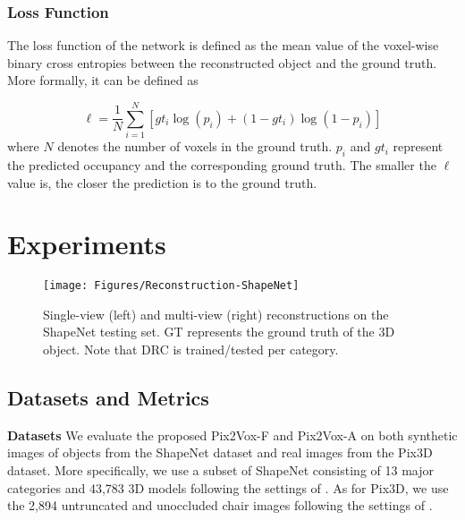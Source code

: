 \documentclass[10pt,twocolumn,letterpaper]{article}
\begin{document}
\vspace{-3 mm}
\subsubsection{Loss Function}
\vspace{-1 mm}

The loss function of the network is defined as the mean value of the voxel-wise binary cross entropies between the reconstructed object and the ground truth.
More formally, it can be defined as

\begin{equation}
  \ell = \frac{1}{N} \sum_{i=1}^N \left[ gt_i \log(p_i) + (1 - gt_i) \log(1 - p_i) \right]
  \label{eq:bce-loss}
\end{equation}
where $N$ denotes the number of voxels in the ground truth. $p_i$ and $gt_i$ represent the predicted occupancy and the corresponding ground truth.
The smaller the $\ell$ value is, the closer the prediction is to the ground truth.

\section{Experiments}

\begin{figure*}
  \centering
  \resizebox{\linewidth}{!} {
    \texttt{[image: Figures/Reconstruction-ShapeNet]}
  }
  \caption{Single-view (left) and multi-view (right) reconstructions on the ShapeNet testing set. GT represents the ground truth of the 3D object. Note that DRC \cite{DBLP:conf/cvpr/TulsianiZEM17} is trained/tested per category.}
  \label{fig:shapenet-reconstruction}
  \vspace{-2 mm}
\end{figure*}

\subsection{Datasets and Metrics}

\noindent \textbf{Datasets}
We evaluate the proposed Pix2Vox-F and Pix2Vox-A on both synthetic images of objects from the ShapeNet \cite{DBLP:conf/cvpr/WuSKYZTX15} dataset and real images from the Pix3D \cite{DBLP:conf/cvpr/Sun0ZZZXTF18} dataset.
More specifically, we use a subset of ShapeNet consisting of 13 major categories and 43,783 3D models following the settings of \cite{DBLP:conf/eccv/ChoyXGCS16}.
As for Pix3D, we use the 2,894 untruncated and unoccluded chair images following the settings of \cite{DBLP:conf/cvpr/Sun0ZZZXTF18}.
\end{document}
